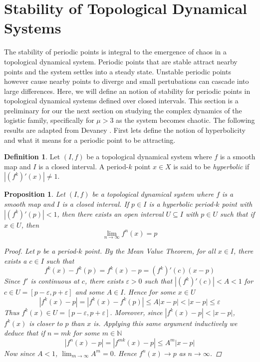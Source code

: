 \documentclass[11pt,a4paper,oneside]{memoir}
\theoremstyle{plain}
\newtheorem{prop}[thm]{Proposition}
\theoremstyle{definition}
\newtheorem{defn}[thm]{Definition}
\begin{document}
\section{Stability of Topological Dynamical Systems}
The stability of periodic points is integral to the emergence of chaos in a topological dynamical system. Periodic points that are stable attract nearby points and the system settles into a steady state. Unstable periodic points however cause nearby points to diverge and small pertubations can cascade into large differences. Here, we will define an notion of stability for periodic points in topological dynamical systems defined over closed intervals. This section is a preliminary for our the next section on studying the complex dynamics of the logistic family, specifically for $\mu > 3$ as the system becomes chaotic. The following results are adapted from Devaney \cite[Section 1.4]{devaney}. First lets define the notion of hyperbolicity and what it means for a periodic point to be attracting.

\begin{defn} \label{defn:hyperbolic}
    Let $(I, f)$ be a topological dynamical system where $f$ is a smooth map and $I$ is a closed interval. A period-$k$ point $x \in X$ is said to be \emph{hyperbolic} if $|(f^k)'(x)| \neq 1$.
\end{defn}

\begin{prop} \label{prop:attracting-point}
    Let $(I, f)$ be a topological dynamical system where $f$ is a smooth map and $I$ is a closed interval. If $p \in I$ is a hyperbolic period-$k$ point with $|(f^k)'(p)| < 1$, then there exists an open interval $U \subseteq I$ with $p \in U$ such that if $x \in U$, then \[ \lim_{n \to \infty} f^n(x) = p \]

    \begin{proof}
        Let $p$ be a period-$k$ point. By the Mean Value Theorem, for all $x \in I$, there exists a $c \in I$ such that \[f^k(x) - f^k(p) = f^k(x) - p = (f^k)'(c)(x-p)\] Since $f'$ is continuous at $c$, there exists $\varepsilon > 0$ such that $|(f^k)'(c)| < A < 1$ for $c \in U = [p - \varepsilon, p + \varepsilon]$ and some $A \in I$. Hence for some $x \in U$ \[|f^k(x) - p| = |f^k(x) - f^k(p)| \leq A|x-p| < |x-p| \leq \varepsilon\] Thus $f^k(x) \in U = [p - \varepsilon, p + \varepsilon]$. Moreover, since $|f^k(x) - p| < |x - p|$, $f^k(x)$ is closer to $p$ than $x$ is. Applying this same argument inductively we deduce that if $n = mk$ for some $m \in \mathbb{N}$ \[|f^n(x) - p| = |f^{mk}(x) - p| \leq A^m|x - p|\] Now since $A < 1$, $\lim_{m \to \infty}A^m = 0$. Hence $f^n(x) \to p$ as $n \to \infty$. 
    \end{proof}
\end{prop}
\end{document}
